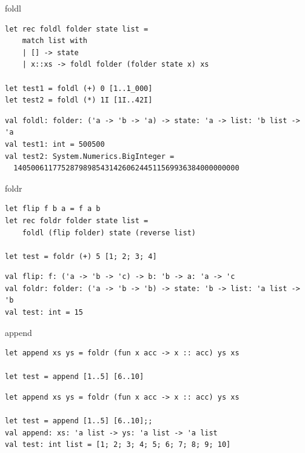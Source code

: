 \documentclass[t]{beamer}
\begin{document}
\begin{frame}[label={sec:org3679f04},fragile]{foldl}
 \begin{verbatim}
let rec foldl folder state list = 
    match list with
    | [] -> state
    | x::xs -> foldl folder (folder state x) xs

let test1 = foldl (+) 0 [1..1_000]
let test2 = foldl (*) 1I [1I..42I]
\end{verbatim}

\begin{verbatim}
val foldl: folder: ('a -> 'b -> 'a) -> state: 'a -> list: 'b list -> 'a
val test1: int = 500500
val test2: System.Numerics.BigInteger =
  1405006117752879898543142606244511569936384000000000
\end{verbatim}
\end{frame}

\begin{frame}[label={sec:orgf85ecc6},fragile]{foldr}
 \begin{verbatim}
let flip f b a = f a b 
let rec foldr folder state list = 
    foldl (flip folder) state (reverse list)

let test = foldr (+) 5 [1; 2; 3; 4]
\end{verbatim}

\begin{verbatim}
val flip: f: ('a -> 'b -> 'c) -> b: 'b -> a: 'a -> 'c
val foldr: folder: ('a -> 'b -> 'b) -> state: 'b -> list: 'a list -> 'b
val test: int = 15
\end{verbatim}
\end{frame}

\begin{frame}[label={sec:org717ce35},fragile]{append}
 \begin{verbatim}
let append xs ys = foldr (fun x acc -> x :: acc) ys xs

let test = append [1..5] [6..10] 
\end{verbatim}

\begin{verbatim}
let append xs ys = foldr (fun x acc -> x :: acc) ys xs

let test = append [1..5] [6..10];;
val append: xs: 'a list -> ys: 'a list -> 'a list
val test: int list = [1; 2; 3; 4; 5; 6; 7; 8; 9; 10]
\end{verbatim}
\end{frame}
\end{document}
